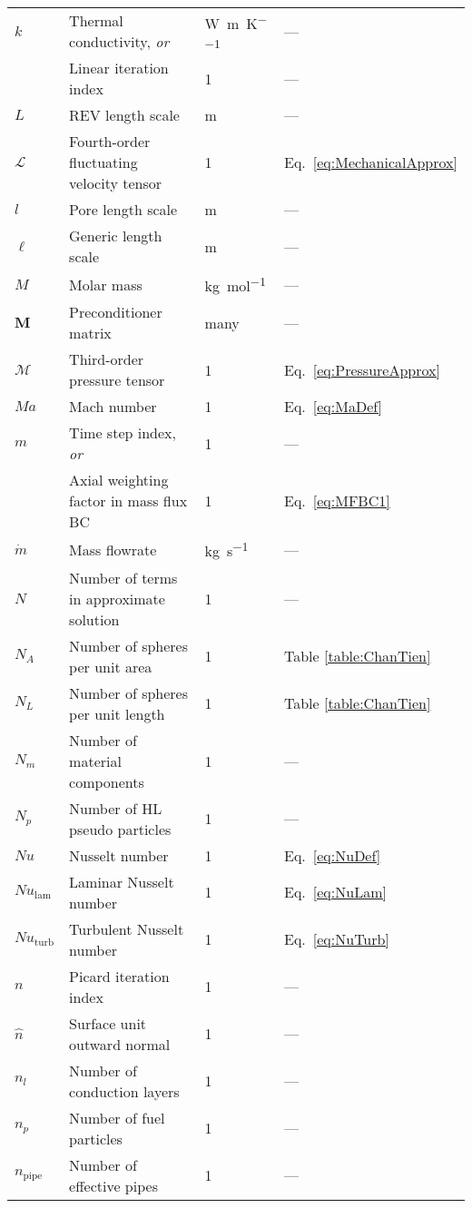 \begin{longtable}{p{2cm}p{9cm}p{2cm}p{5cm}}
\(k\) & Thermal conductivity, \textit{or} & \si{\watt\per\meter\per\kelvin} & ---\\
& Linear iteration index & 1 & ---\\
\(L\) & REV length scale & \si{\meter} & ---\\
\(\mathscr{L}\) & Fourth-order fluctuating velocity tensor & 1 & Eq.\ \eqref{eq:MechanicalApprox}\\
\(l\) & Pore length scale & \si{\meter} & ---\\
\(\ell\) & Generic length scale & \si{\meter} & ---\\
\(M\) & Molar mass & \si{\kilo\gram\per\mole} & ---\\
\(\textbf{M}\) & Preconditioner matrix & many & ---\\
\(\mathscr{M}\) & Third-order pressure tensor & 1 & Eq.\ \eqref{eq:PressureApprox}\\
\(Ma\) & Mach number & 1 & Eq.\ \eqref{eq:MaDef}\\
\(m\) & Time step index, \textit{or} & 1 & ---\\
& Axial weighting factor in mass flux BC & 1 & Eq.\ \eqref{eq:MFBC1}\\
\(\dot{m}\) & Mass flowrate & \si{\kilo\gram\per\second} & ---\\
\(N\) & Number of terms in approximate solution & 1 & ---\\
\(N_A\) & Number of spheres per unit area & 1 & Table \ref{table:ChanTien}\\
\(N_L\) & Number of spheres per unit length & 1 & Table \ref{table:ChanTien}\\
\(N_m\) & Number of material components & 1 & ---\\
\(N_p\) & Number of HL pseudo particles & 1 & ---\\
\(Nu\) & Nusselt number & 1 & Eq.\ \eqref{eq:NuDef}\\
\(Nu_\text{lam}\) & Laminar Nusselt number & 1 & Eq.\ \eqref{eq:NuLam}\\
\(Nu_\text{turb}\) & Turbulent Nusselt number & 1 & Eq.\ \eqref{eq:NuTurb}\\
\(n\) & Picard iteration index & 1 & ---\\
\(\hat{n}\) & Surface unit outward normal & 1 & ---\\
\(n_l\) & Number of conduction layers & 1 & ---\\
\(n_p\) & Number of fuel particles & 1 & ---\\
\(n_\text{pipe}\) & Number of effective pipes & 1 & ---\\

\end{longtable}
